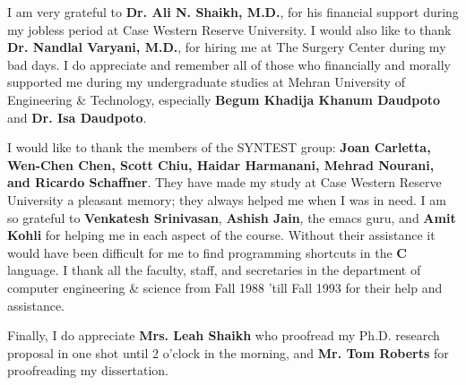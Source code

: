 I am very grateful to {\bf Dr. Ali N. Shaikh, M.D.}, for his financial
support during my jobless period at Case Western Reserve University. I
would also like to thank {\bf Dr. Nandlal Varyani, M.D.}, for hiring
me at The Surgery Center during my bad days. I do appreciate and
remember all of those who financially and morally supported me during
my undergraduate studies at Mehran University of Engineering \&
Technology, especially {\bf Begum Khadija Khanum Daudpoto} and {\bf
Dr. Isa Daudpoto}.

I would like to thank the members of the SYNTEST group: {\bf Joan
Carletta, Wen-Chen Chen, Scott Chiu, Haidar Harmanani, Mehrad Nourani,
and Ricardo Schaffner}. They have made my study at Case Western
Reserve University a pleasant memory; they always helped me when I was
in need. I am so grateful to {\bf Venkatesh Srinivasan}, {\bf Ashish
Jain}, the emacs guru, and {\bf Amit Kohli} for helping me in each
aspect of the course. Without their assistance it would have been
difficult for me to find programming shortcuts in the {\bf C}
language. I thank all the faculty, staff, and secretaries in the
department of computer engineering \& science from Fall 1988 'till
Fall 1993 for their help and assistance.

Finally, I do appreciate {\bf Mrs. Leah Shaikh} who proofread my Ph.D.
research proposal in one shot until 2 o'clock in the morning, and {\bf
Mr. Tom Roberts} for proofreading my dissertation.
